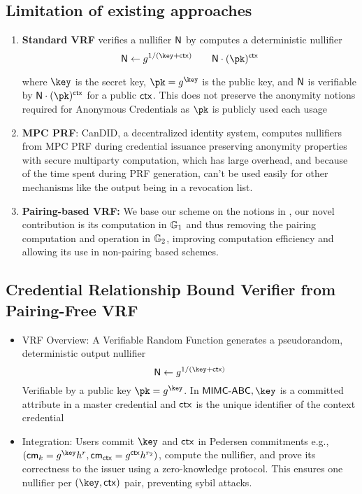 \subsection{Limitation of existing approaches}
\begin{enumerate}
    \item \textbf{Standard VRF} verifies a nullifier $\mathsf{N}$ by computes a deterministic nullifier
    \[
        \nul \gets g^{1/(\key + \ctx)}    \qquad \nul \cdot (\pk)^{\ctx}
    \]
    
    where $\key$ is the secret key, $\pk = g^{\key}$ is the public key, and $\mathsf{N}$ is verifiable by $\nul \cdot (\pk)^{\ctx}$ for a public $\mathsf{ctx}$. This does not preserve the anonymity notions required for Anonymous Credentials as $\pk$ is publicly used each usage
    \item \textbf{MPC PRF}: CanDID, a decentralized identity system, computes nullifiers from MPC PRF during credential issuance preserving anonymity properties with secure multiparty computation, which has large overhead, and because of the time spent during PRF generation, can't be used easily for other mechanisms like the output being in a revocation list.
    \item \textbf{Pairing-based VRF:}  We base our scheme on the notions in \cite{tomescu2022utt}, our novel contribution is its computation in $\mathbb{G}_1$ and thus removing the pairing computation and operation in $\mathbb{G}_2$, improving computation efficiency and allowing its use in non-pairing based schemes.
\end{enumerate}


\subsection{Credential Relationship Bound Verifier from Pairing-Free VRF}
\begin{itemize}
    \item VRF Overview: A Verifiable Random Function generates a pseudorandom, deterministic output nullifier 
    \[
    \nul \gets g^{1/(\key + \ctx)}
    \]
    Verifiable by a public key $\pk = g^{\key}$. In $\MIMCABC, \key$ is a committed attribute in a master credential and $\mathsf{ctx}$ is the unique identifier of the context credential

    \item Integration: Users commit $\key$ and $\mathsf{ctx}$ in Pedersen commitments e.g., $( \cm_k = g^{\key} h^r, \cm_{\ctx} = g^{\ctx} h^{r_2})$, compute the nullifier, and prove its correctness to the issuer using a zero-knowledge protocol. This ensures one nullifier per $(\key, \ctx)$ pair, preventing sybil attacks.
\end{itemize}


